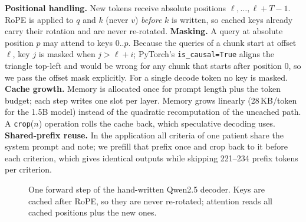 \documentclass[conference]{IEEEtran}
\begin{document}
\textbf{Positional handling.} New tokens receive absolute positions $\ell,\dots,\ell+T-1$. RoPE is applied to $q$ and $k$ (never $v$) \emph{before} $k$ is written, so cached keys already carry their rotation and are never re-rotated.
\textbf{Masking.} A query at absolute position $p$ may attend to keys $0..p$. Because the queries of a chunk start at offset $\ell$, key $j$ is masked when $j > \ell+i$; PyTorch's \texttt{is\_causal=True} aligns the triangle top-left and would be wrong for any chunk that starts after position 0, so we pass the offset mask explicitly. For a single decode token no key is masked.
\textbf{Cache growth.} Memory is allocated once for prompt length plus the token budget; each step writes one slot per layer. Memory grows linearly (28\,KB/token for the 1.5B model) instead of the quadratic recomputation of the uncached path. A \texttt{crop}($n$) operation rolls the cache back, which speculative decoding uses.
\textbf{Shared-prefix reuse.} In the application all criteria of one patient share the system prompt and note; we prefill that prefix once and crop back to it before each criterion, which gives identical outputs while skipping 221--234 prefix tokens per criterion.

\begin{figure}[t]
\centering
{}
\caption{One forward step of the hand-written Qwen2.5 decoder. Keys are cached after RoPE, so they are never re-rotated; attention reads all cached positions plus the new ones.}
\label{fig:decoder}
\end{figure}
\end{document}
